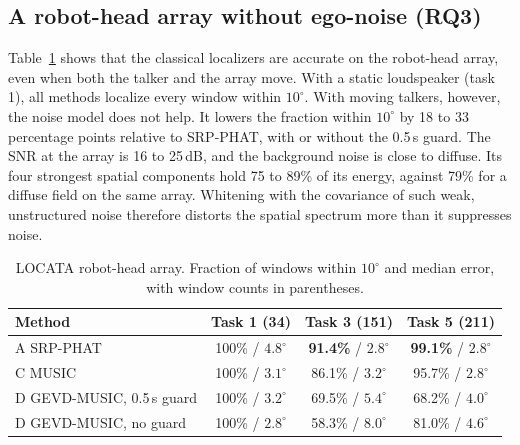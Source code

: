 \documentclass{svproc}
\begin{document}
\subsection{A robot-head array without ego-noise (RQ3)}
Table~\ref{tab:locata} shows that the classical localizers are accurate on the robot-head array, even when both the talker and the array move.
With a static loudspeaker (task 1), all methods localize every window within $10^\circ$.
With moving talkers, however, the noise model does not help.
It lowers the fraction within $10^\circ$ by 18 to 33 percentage points relative to SRP-PHAT, with or without the 0.5\,s guard.
The SNR at the array is 16 to 25\,dB, and the background noise is close to diffuse.
Its four strongest spatial components hold 75 to 89\% of its energy, against 79\% for a diffuse field on the same array.
Whitening with the covariance of such weak, unstructured noise therefore distorts the spatial spectrum more than it suppresses noise.
\begin{table}[]
\renewcommand{\arraystretch}{1.05}
\centering
\scriptsize
\vspace{-25pt}
\caption{LOCATA robot-head array. Fraction of windows within $10^\circ$ and median error, with window counts in parentheses.}
\label{tab:locata}
\begin{tabular}{|l|c|c|c|}
\hline
\textbf{Method} & \textbf{Task 1 (34)} & \textbf{Task 3 (151)} & \textbf{Task 5 (211)} \\
\hline
A SRP-PHAT & 100\% / $4.8^\circ$ & \textbf{91.4\%} / $2.8^\circ$ & \textbf{99.1\%} / $2.8^\circ$ \\
C MUSIC & 100\% / $3.1^\circ$ & 86.1\% / $3.2^\circ$ & 95.7\% / $2.8^\circ$ \\
D GEVD-MUSIC, 0.5\,s guard & 100\% / $3.2^\circ$ & 69.5\% / $5.4^\circ$ & 68.2\% / $4.0^\circ$ \\
D GEVD-MUSIC, no guard & 100\% / $2.8^\circ$ & 58.3\% / $8.0^\circ$ & 81.0\% / $4.6^\circ$ \\
\hline
\end{tabular}
\end{table}
\vspace{-20pt}
\end{document}
